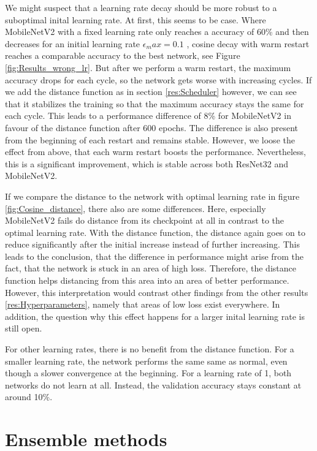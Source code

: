 We might suspect that a learning rate decay should be more robust to a
suboptimal inital learning rate. At first, this seems to be case. Where
MobileNetV2 with a fixed learning rate only reaches a accuracy of 60\% and then
decreases for an initial learning rate  $\epsilon_max = 0.1$ , cosine decay with
warm restart reaches a comparable accuracy to the best network, see Figure
\ref{fig:Results_wrong_lr}. But after we perform a warm restart, the maximum
accuracy drops for each cycle, so the network gets worse with increasing cycles.
If we add the distance function as in section \ref{res:Scheduler} however, we
can see that it stabilizes the training so that the maximum accuracy stays the
same for each cycle. This leads to a performance difference of 8\% for
MobileNetV2 in favour of the distance function after 600 epochs. The difference
is also present from the beginning of each restart and remains stable. However,
we loose the effect from above, that each warm restart boosts the performance.
Nevertheless, this is a significant improvement, which is stable across both
ResNet32 and MobileNetV2.

If we compare the distance to the network with optimal learning rate in figure
\ref{fig:Cosine_distance}, there also are some differences. Here, especially
MobileNetV2 fails do distance from its checkpoint at all in contrast to the
optimal learning rate. With the distance function, the distance again goes on to
reduce significantly after the initial increase instead of further increasing.
This leads to the conclusion, that the difference in performance might arise
from the fact, that the network is stuck in an area of high loss. Therefore, the
distance function helps distancing from this area into an area of better
performance. However, this interpretation would contrast other findings from the
other results \ref{res:Hyperparameters}, namely that areas of low loss exist
everywhere. In addition, the question why this effect happens for a larger
inital learning rate is still open.

For other learning rates, there is no benefit from the distance function. For a
smaller learning rate, the network performs the same same as normal, even though
a slower convergence at the beginning. For a learning rate of 1, both networks
do not learn at all. Instead, the validation accuracy stays constant at around
10\%.





\section{Ensemble methods}\label{res:Ensemble} 


